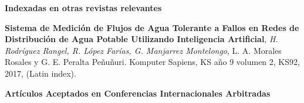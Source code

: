 \documentclass[10pt]{article}
\newenvironment{innerlist}[1][\enskip\textbullet]%
        {\begin{compactitem}[#1]}{\end{compactitem}}
\newcommand{\blankline}{\quad\pagebreak[2]}
\begin{document}


\textbf{Indexadas en otras revistas relevantes }
\begin{innerlist}
\item \textbf{Sistema de Medición de Flujos de Agua Tolerante a Fallos en Redes de Distribución de Agua Potable Utilizando Inteligencia Artificial}, \textit{H. Rodríguez Rangel, R. López Farías, G. Manjarrez Montelongo}, L. A. Morales Rosales y G. E. Peralta Peñuñuri. Komputer Sapiens, KS año 9 volumen 2, KS92, 2017, (Latin index).
\end{innerlist}



\blankline



\textbf{Artículos Aceptados en Conferencias Internacionales Arbitradas}
\end{document}
